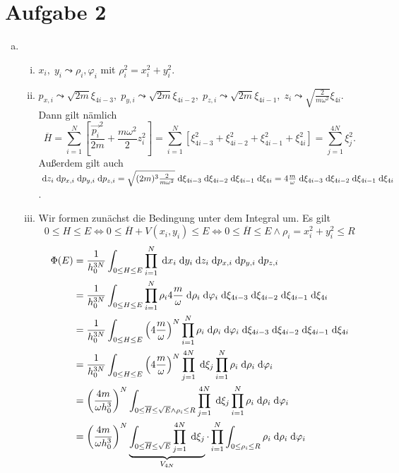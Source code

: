 \documentclass{article}
\theoremstyle{definition}
\newcommand{\equals}{\Longleftrightarrow}
\begin{document}
\section*{Aufgabe 2}
\begin{enumerate}[(a)]
    \item \begin{enumerate}[(i)]
        \item $x_i,\; y_i \leadsto \rho_i, \varphi_i$ mit $\rho_i^2 = x_i^2 + y_i^2$.
        \item $p_{x,i} \leadsto \sqrt{2m} \xi_{4i-3},\; p_{y,i} \leadsto \sqrt{2m} \xi_{4i-2},\; p_{z,i} \leadsto \sqrt{2m} \xi_{4i-1},\; z_i \leadsto \sqrt{\frac{2}{m\omega^2}} \xi_{4i}$. Dann gilt nämlich \[\overline{H} = \sum_{i = 1}^{N} \left[\frac{\vec{p_i}^2}{2m} + \frac{m\omega^2}{2}z_i^2\right] = \sum_{i = 1}^{N}\left[\xi_{4i-3}^2 + \xi_{4i-2}^2 + \xi_{4i-1}^2 + \xi_{4i}^2\right] = \sum_{j = 1}^{4N}\xi_j^2.\] Außerdem gilt auch $\d z_i\d p_{x,i}\d p_{y,i}\d p_{z,i} = \sqrt{(2m)^3\frac{2}{m\omega^2}} \d \xi_{4i-3}\d \xi_{4i-2}\d \xi_{4i-1}\d \xi_{4i} = 4\frac{m}{\omega} \d \xi_{4i-3}\d \xi_{4i-2}\d \xi_{4i-1}\d \xi_{4i}$.
        \item Wir formen zunächst die Bedingung unter dem Integral um. Es gilt \[0 \le H \le E \equals 0 \le \overline{H} + V(x_i,y_i)\le E \equals 0 \le \overline{H} \le E \land \rho_i = x_i^2 + y_i^2\leq R\]
        \begin{align*}
            \Phi(E) &= \frac{1}{h_0^{3N}} \int_{0\le H \le E}\prod_{i=1}^N\d x_i\d y_i\d z_i\d p_{x,i}\d p_{y,i}\d p_{z,i}\\
            &= \frac{1}{h_0^{3N}} \int_{0\le H \le E} \prod_{i=1}^N\rho_i 4\frac{m}{\omega}\d \rho_i\d \varphi_i  \d \xi_{4i-3}\d \xi_{4i-2}\d \xi_{4i-1}\d \xi_{4i}\\
            &= \frac{1}{h_0^{3N}} \int_{0\le H \le E} \left(4\frac{m}{\omega}\right)^N \prod_{i=1}^N\rho_i \d \rho_i\d \varphi_i  \d \xi_{4i-3}\d \xi_{4i-2}\d \xi_{4i-1}\d \xi_{4i}\\
            &= \frac{1}{h_0^{3N}} \int_{0\le H \le E}\left(4\frac{m}{\omega}\right)^N\prod_{j=1}^{4N}\d \xi_j \prod_{i=1}^N\rho_i \d \rho_i\d \varphi_i\\
            &= \left(\frac{4m}{\omega h_0^{3}}\right)^N \int_{0\le \overline{H} \le \sqrt{E} \land \rho_i \le R}\prod_{j=1}^{4N}\d \xi_j \prod_{i=1}^N\rho_i \d \rho_i\d \varphi_i\\
            &= \left(\frac{4m}{\omega h_0^{3}}\right)^N \underbrace{\int_{0\le \overline{H} \le \sqrt{E}}\prod_{j=1}^{4N}\d \xi_j}_{V_{4N}} \cdot \prod_{i=1}^N \int_{0\le \rho_i \le R} \rho_i \d \rho_i\d \varphi_i\\

\end{align*}
\end{enumerate}
\end{enumerate}
\end{document}
